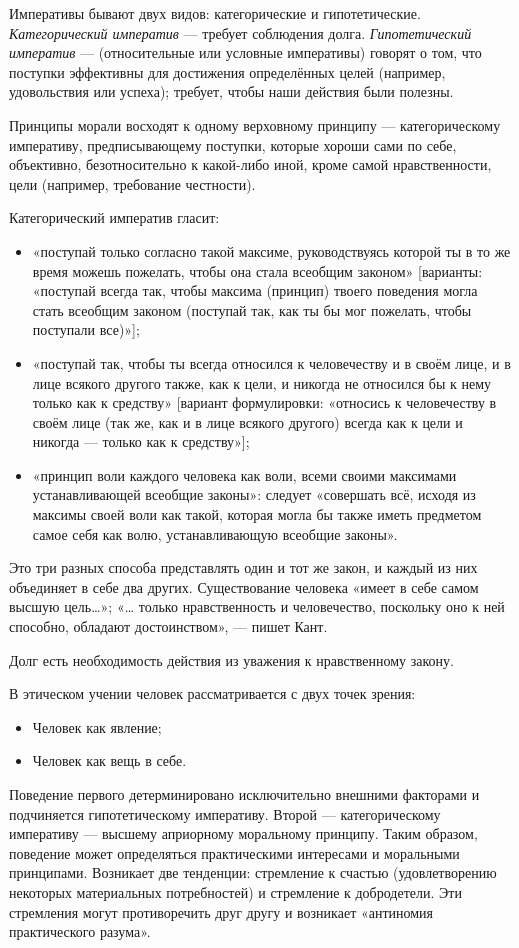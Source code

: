 \documentclass[12pt]{article}
\begin{document}
Императивы бывают двух видов: категорические и гипотетические.
\textit{Категорический императив} --- требует соблюдения долга.
\textit{Гипотетический императив} --- (относительные или условные императивы) говорят о том, что поступки эффективны для достижения определённых целей (например, удовольствия или успеха); требует, чтобы наши действия были полезны.

Принципы морали восходят к одному верховному принципу — категорическому императиву, предписывающему поступки, которые хороши сами по себе, объективно, безотносительно к какой-либо иной, кроме самой нравственности, цели (например, требование честности).

Категорический императив гласит:
\begin{itemize}
\item «поступай только согласно такой максиме, руководствуясь которой ты в то же время можешь пожелать,
	чтобы она стала всеобщим законом»
	[варианты: «поступай всегда так, чтобы максима (принцип) твоего поведения могла стать всеобщим законом
	(поступай так, как ты бы мог пожелать, чтобы поступали все)»];
\item «поступай так, чтобы ты всегда относился к человечеству и в своём лице, и в лице всякого другого также,
	как к цели, и никогда не относился бы к нему только как к средству»
	[вариант формулировки: «относись к человечеству в своём лице (так же, как и в лице всякого другого)
	всегда как к цели и никогда — только как к средству»];
\item «принцип воли каждого человека как воли, всеми своими максимами устанавливающей всеобщие законы»:
	следует «совершать всё, исходя из максимы своей воли как такой,
	которая могла бы также иметь предметом самое себя как волю, устанавливающую всеобщие законы».
\end{itemize}
Это три разных способа представлять один и тот же закон, и каждый из них объединяет в себе два других.
Существование человека «имеет в себе самом высшую цель…»; «… только нравственность и человечество, поскольку оно к ней способно, обладают достоинством», — пишет Кант.

Долг есть необходимость действия из уважения к нравственному закону.

В этическом учении человек рассматривается с двух точек зрения:
\begin{itemize}
\item Человек как явление;
\item Человек как вещь в себе.
\end{itemize}
Поведение первого детерминировано исключительно внешними факторами и подчиняется гипотетическому
императиву. Второй — категорическому императиву — высшему априорному моральному принципу. Таким
образом, поведение может определяться практическими интересами и моральными принципами. Возникает две
тенденции: стремление к счастью (удовлетворению некоторых материальных потребностей) и стремление к
добродетели. Эти стремления могут противоречить друг другу и возникает «антиномия практического разума».
\end{document}
